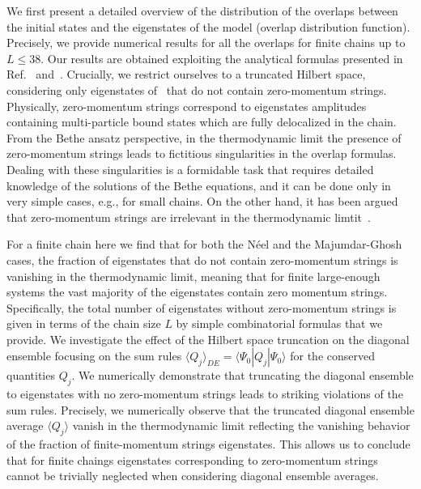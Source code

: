 \documentclass[11pt]{iopart}
\begin{document}
We first present a detailed overview of the distribution of the overlaps between 
the initial states and the eigenstates of the model (overlap distribution function). 
Precisely, we provide numerical results for all the overlaps for finite chains up 
to $L\le 38$. Our results are obtained exploiting the analytical formulas 
presented in Ref.~\cite{brockmann-2014} and~\cite{pozsgay-2014a}. Crucially, 
we restrict ourselves to a truncated Hilbert space, considering only eigenstates 
of~ that do not contain zero-momentum strings. Physically, 
zero-momentum strings correspond to eigenstates amplitudes containing multi-particle  
bound states which are fully delocalized in the chain. From the Bethe ansatz perspective, 
in the thermodynamic limit the presence of zero-momentum strings leads to fictitious 
singularities in the overlap formulas. Dealing with these singularities is 
a formidable task that requires detailed knowledge of the solutions of the 
Bethe equations, and it can be done only in very simple cases, e.g., for small 
chains. On the other hand, it has been argued that zero-momentum strings are irrelevant 
in the thermodynamic limtit~\cite{brockmann-2014a}. 

For a finite chain here we find that for both the N\'eel and the Majumdar-Ghosh 
cases, the fraction of eigenstates that do not contain zero-momentum strings 
is vanishing in the thermodynamic limit, meaning that for finite large-enough 
systems the vast majority of the eigenstates contain zero momentum strings. Specifically, 
the total number of eigenstates without zero-momentum strings is given in terms of the 
chain size $L$ by simple combinatorial formulas that we provide. We investigate the 
effect of the Hilbert space truncation on the diagonal ensemble focusing on the  
sum rules $\langle Q_j\rangle_{DE}=\langle\Psi_0|Q_j|\Psi_0\rangle$ for the conserved 
quantities $Q_j$. We numerically demonstrate that truncating the diagonal ensemble to 
eigenstates with no zero-momentum strings leads to striking violations of the sum 
rules. Precisely, we numerically observe that the truncated diagonal ensemble 
average $\langle Q_j\rangle$ vanish in the thermodynamic limit reflecting the 
vanishing behavior of the fraction of finite-momentum strings eigenstates. 
This allows us to conclude that for finite chaings eigenstates corresponding 
to zero-momentum strings cannot be trivially neglected when considering 
diagonal ensemble averages. 
\end{document}

